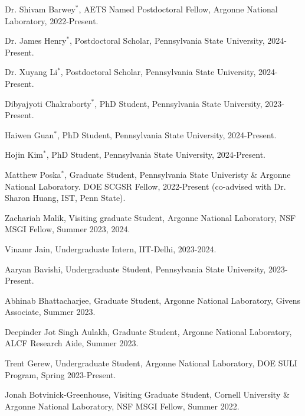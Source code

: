 \documentclass[letterpaper]{article}
\renewenvironment{itemize}{
  \begin{list}{}{
    \setlength{\leftmargin}{1.5em}
  }
}{
  \end{list}
}
\begin{document}
\begin{itemize}

  \item Dr. Shivam Barwey$^\ast$, AETS Named Postdoctoral Fellow, Argonne National Laboratory, 2022-Present.

  \item Dr. James Henry$^\ast$, Postdoctoral Scholar, Pennsylvania State University, 2024-Present.

  \item Dr. Xuyang Li$^\ast$, Postdoctoral Scholar, Pennsylvania State University, 2024-Present.

  \item Dibyajyoti Chakraborty$^\ast$, PhD Student, Pennsylvania State University, 2023-Present.

  \item Haiwen Guan$^\ast$, PhD Student, Pennsylvania State University, 2024-Present.

  \item Hojin Kim$^\ast$, PhD Student, Pennsylvania State University, 2024-Present.

  \item Matthew Poska$^\ast$, Graduate Student, Pennsylvania State Univeristy \& Argonne National Laboratory. DOE SCGSR Fellow, 2022-Present (co-advised with Dr. Sharon Huang, IST, Penn State).

  \item Zachariah Malik, Visiting graduate Student, Argonne National Laboratory, NSF MSGI Fellow, Summer 2023, 2024.

  \item Vinamr Jain, Undergraduate Intern, IIT-Delhi, 2023-2024.

  \item Aaryan Bavishi, Undergraduate Student, Pennsylvania State University, 2023-Present.

  \item Abhinab Bhattacharjee, Graduate Student, Argonne National Laboratory, Givens Associate, Summer 2023.

  \item Deepinder Jot Singh Aulakh, Graduate Student, Argonne National Laboratory, ALCF Research Aide, Summer 2023.

  \item Trent Gerew, Undergraduate Student, Argonne National Laboratory, DOE SULI Program, Spring 2023-Present.

  \item Jonah Botvinick-Greenhouse, Visiting Graduate Student, Cornell University \& Argonne National Laboratory, NSF MSGI Fellow, Summer 2022.


\end{itemize}
\end{document}
